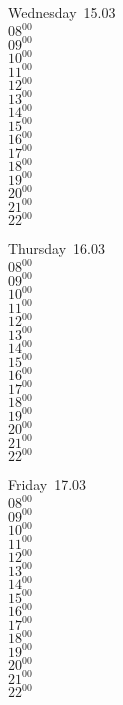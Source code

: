 \documentclass[11pt,a4paper]{book}\usepackage[]{graphicx}\usepackage[]{color}
\begin{document}
\begin{weekdaybox}
  Wednesday~15.03\\
  { 
  \vfill
  $08^{00}$\\
$09^{00}$\\
$10^{00}$\\
$11^{00}$\\
$12^{00}$\\
$13^{00}$\\
$14^{00}$\\
$15^{00}$\\
$16^{00}$\\
$17^{00}$\\
$18^{00}$\\
$19^{00}$\\
$20^{00}$\\
$21^{00}$\\
$22^{00}$\\
  }
\end{weekdaybox}
\clearpage
\begin{headerbox}
\end{headerbox}
\begin{weekdaybox}
  Thursday~16.03\\
  { 
  \vfill
  $08^{00}$\\
$09^{00}$\\
$10^{00}$\\
$11^{00}$\\
$12^{00}$\\
$13^{00}$\\
$14^{00}$\\
$15^{00}$\\
$16^{00}$\\
$17^{00}$\\
$18^{00}$\\
$19^{00}$\\
$20^{00}$\\
$21^{00}$\\
$22^{00}$\\
  }
\end{weekdaybox} 
\begin{weekdaybox}
  Friday~17.03\\
  { 
  \vfill
  $08^{00}$\\
$09^{00}$\\
$10^{00}$\\
$11^{00}$\\
$12^{00}$\\
$13^{00}$\\
$14^{00}$\\
$15^{00}$\\
$16^{00}$\\
$17^{00}$\\
$18^{00}$\\
$19^{00}$\\
$20^{00}$\\
$21^{00}$\\
$22^{00}$\\
  }
\end{weekdaybox}
\end{document}
